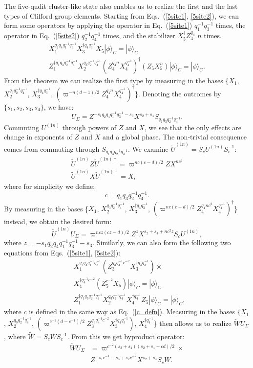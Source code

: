 \documentclass[aps,amsfonts,pra,twocolumn,showpacs]{revtex4-1}
\newcommand{\be}{\begin{equation}}
\newcommand{\ee}{\end{equation}}
\begin{document}
	The five-qudit cluster-like state also enables us to realize the first and the last types of Clifford group elements. Starting from Eqs.~(\ref{5site1}, \ref{5site2}), we can form some operators by applying the operator in Eq.~(\ref{5site1}) $q_1^{-1}q_3^{-1}$ times, the operator in Eq.~(\ref{5site2}) $q_2^{-1}q_4^{-1}$ times, and the stabilizer $X_5^\dagger Z_4^{q_4}$ $n$ times.
		\begin{align}
		X_1^{q_2q_4q_1^{-1}q_3^{-1}} X_3^{\dagger q_4q_3^{-1}} X_5 |\phi\rangle_C = |\phi\rangle_C \\
		Z_1^{\dagger q_1q_3q_2^{-1}q_4^{-1}} X_2^{q_3q_2^{-1}q_4^{-1}} (Z_4^{q_4n}X_4^{q_4^{-1}})^\dagger (Z_5 X_5^n) |\phi\rangle_C = |\phi\rangle_C.
		\end{align}
	From the theorem we can realize the first type by measuring in the bases \{$X_1$, $X_2^{q_3q_2^{-1}q_4^{-1}}$, $X_3^{\dagger q_4q_3^{-1}}$, $(\varpi^{-n(d-1)/2}Z_4^{q_4n}X_4^{q_4^{-1}})^\dagger$\}. Denoting the outcomes by $\{s_1, s_2, s_3, s_4\}$, we have:
		\be
		U_\Sigma = Z^{-s_1q_2q_4q_1^{-1}q_3^{-1}-s_3} X^{s_2+s_4} S_{q_1q_3q_2^{-1}q_4^{-1}}.
		\ee
	Commuting $U^{(1n)}$ through powers of $Z$ and $X$, we see that the only effects are change in exponents of $Z$ and $X$ and a global phase. The non-trivial consequence comes from commuting through $S_{q_1q_3q_2^{-1}q_4^{-1}}$. We examine $\tilde{U}^{(1n)} = S_cU^{(1n)}S_c^{-1}$:
		\begin{align}
		\tilde{U}^{(1n)} Z \tilde{U}^{(1n)\dagger} = \varpi^{nc(c-d)/2} ZX^{nc^2} \\
		\tilde{U}^{(1n)} X \tilde{U}^{(1n)\dagger} = X,
		\end{align}
	where for simplicity we define:
		\be
		c=q_1q_3q_2^{-1}q_4^{-1} \label{c_defn}.
		\ee
	By measuring in the bases \{$X_1$, $X_2^{q_3q_2^{-1}q_4^{-1}}$, $X_3^{\dagger q_4q_3^{-1}}$, $(\varpi^{nc(c-d)/2}Z_4^{q_4nc^2}X_4^{q_4^{-1}})^\dagger$\} instead, we obtain the desired form:
		\be
		\tilde{U}^{(1n)} U_\Sigma = \varpi^{ncz(cz-d)/2} Z^{z} X^{s_2+s_4+nc^2z} S_c U^{(1n)},
		\ee
	where $z=-s_1q_2q_4q_1^{-1}q_3^{-1}-s_3$. Similarly, we can also form the following two equations from Eqs.~(\ref{5site1}, \ref{5site2}):
		\begin{align}
		& X_1^{q_2q_4q_1^{-1}q_3^{-1}} (Z_3^{q_3q_4^{-1}c^{-2}} X_3^{\dagger q_4q_3^{-1}}) \times \nonumber \\
			& X_4^{\dagger q_4^{-1}c^{-2}} (Z_5^{c^{-2}} X_5) |\phi\rangle_C = |\phi\rangle_C \\
		& Z_1^{\dagger q_1q_3q_2^{-1}q_4^{-1}} X_2^{q_3q_2^{-1}q_4^{-1}} X_4^{\dagger q_4^{-1}} Z_5 |\phi\rangle_C = |\phi\rangle_C,
		\end{align}
	where $c$ is defined in the same way as Eq.~(\ref{c_defn}). Measuring in the bases \{$X_1$, $X_2^{q_3q_2^{-1}q_4^{-1}}$, $(\varpi^{c^{-1}(d-c^{-1})/2} Z_3^{q_3q_4^{-1}c^{-2}} X_3^{\dagger q_4q_3^{-1}})$, $X_4^{\dagger q_4^{-1}}$\} then allows us to realize $\tilde{W}U_\Sigma$, where $\tilde{W} = S_cWS_c^{-1}$. From this we get byproduct operator:
		\begin{align}
		\tilde{W} U_\Sigma & = \varpi^{c^{-2}(s_2+s_4)(s_2+s_4-cd)/2} \times \nonumber \\
		& Z^{-s_1c^{-1}-s_3+s_2c^{-2}} X^{s_2+s_4} S_c W.
		\end{align}
	
\end{document}
